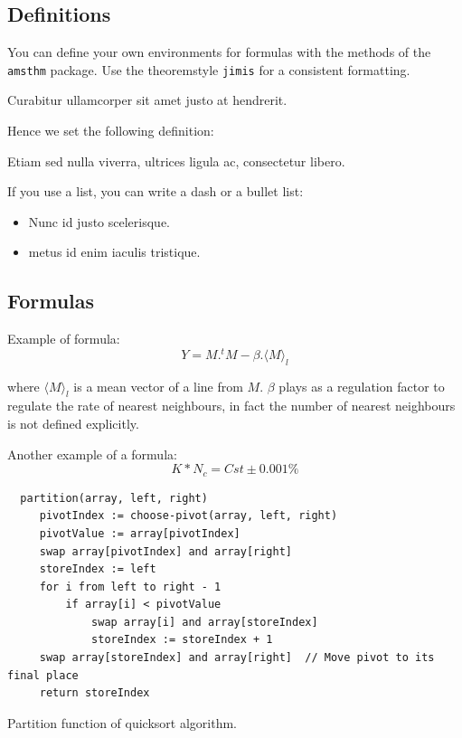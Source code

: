 \documentclass{jimis-final-en}
\begin{document}
\subsection{Definitions}
You can define your own environments for formulas with the methods of the \texttt{amsthm} package. Use the theoremstyle \texttt{jimis} for a consistent formatting.

\begin{definition}[alpha]
Curabitur ullamcorper sit amet justo at hendrerit.
\end{definition}

Hence we set the following definition:

\begin{definition}[beta]
Etiam sed nulla viverra, ultrices ligula ac, consectetur libero.
\end{definition}

If you use a list, you can write a dash or a bullet list:
\begin{itemize}
  \item Nunc id justo scelerisque.
  \item metus id enim iaculis tristique.
\end{itemize}

\subsection{Formulas}

Example of formula:
\begin{equation}
  Y=M.^tM-\beta.\langle M \rangle_l
\end{equation}

where $\langle M \rangle_l$ is a mean vector of a line from $M$. $\beta$ plays as a regulation factor to regulate the
rate of nearest neighbours, in fact the number of nearest neighbours is not defined explicitly.

Another example of a formula:
\begin{equation}
  K * N_c = Cst \pm 0.001\%
\end{equation}

\begin{listing}
  \begin{lstlisting}
  partition(array, left, right)
     pivotIndex := choose-pivot(array, left, right)
     pivotValue := array[pivotIndex]
     swap array[pivotIndex] and array[right]
     storeIndex := left
     for i from left to right - 1
         if array[i] < pivotValue
             swap array[i] and array[storeIndex]
             storeIndex := storeIndex + 1
     swap array[storeIndex] and array[right]  // Move pivot to its final place
     return storeIndex
  \end{lstlisting}
  \caption{Partition function of quicksort algorithm.}
  \label{lst:example}
\end{listing}
\end{document}
